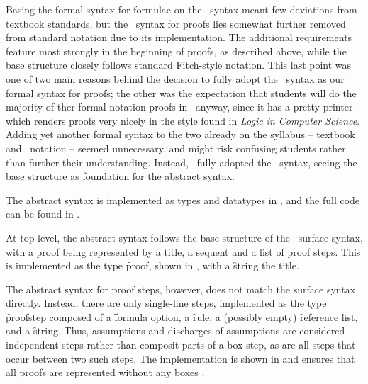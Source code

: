 \documentclass[BA.tex]{subfiles}
\begin{document}
 Basing the formal syntax for formulae on the \bp\ syntax meant few
 deviations from textbook standards, but the \bp\ syntax for proofs lies 
 somewhat further removed from standard notation due to its implementation.
 The additional requirements feature most strongly in the beginning of 
 proofs, as described above, while the base structure closely follows 
 standard Fitch-style notation. This last point was one of two main
 reasons behind the decision to fully adopt the \bp\ syntax as our formal
 syntax for proofs; the other was the expectation that students will do
 the majority of ther formal notation proofs in \bp\ anyway, since it has
 a pretty-printer which renders proofs very nicely in the style found in
 \emph{Logic in Computer Science}. Adding yet another formal
 syntax to the two already on the syllabus -- textbook and \bp\ notation --
 seemed unnecessary, and might risk confusing students rather than further
 their understanding. Instead, \we\ fully adopted the \bp\ syntax, seeing
 the base structure as  foundation for the abstract syntax.

\label{abssyn}

The abstract syntax is implemented as types and datatypes in ,
 and the full code can be found in . 

At top-level, the abstract syntax follows the base structure of the
 \bp\ surface syntax, with a proof being represented by a title, a 
 sequent and a list of proof steps. This is implemented as the type
 \f{proof}, shown in , with a \f{string} 
  the title.
 
 
 The abstract syntax for proof steps, however, does not match the surface
 syntax directly. Instead, there are only single-line steps, implemented
 as the type \f{proofstep} composed of a 
 \f{formula option}, a \f{rule}, a (possibly empty) \f{reference list}, 
 and a \f{string}. Thus, assumptions and discharges of assumptions are
 considered independent steps rather than composit parts of a box-step, as
 are all steps that occur between two such steps.
 The implementation is shown in 
  and ensures that all proofs are represented
 without any boxes \chk{or their nesting to arbitrary depth}.

\end{document}
